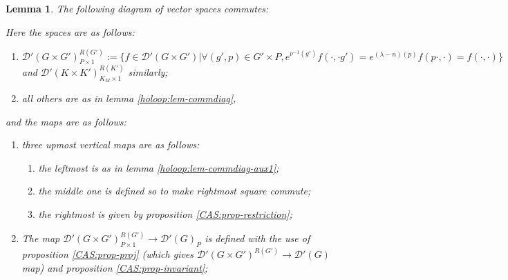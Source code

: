 \documentclass{article}
\newcommand{\assign}{:=}
\newcommand{\nobracket}{}
\newtheorem{lemma}{Lemma}
\begin{document}
\begin{lemma}
  \label{holoop:lem-main-commdiag}The following diagram of vector spaces
  commutes:
  
  \begin{center}
  \end{center}
  
  Here the spaces are as follows:
  \begin{enumerate}
    \item $\mathcal{D}' (G \times G')_{P \times 1}^{R (G')} \assign \{ f \in
    \mathcal{D}' (G \times G') | \forall (g', p) \in G' \times P, e^{\nu^{- 1}
    (g')} f (\cdot, \cdot g') = e^{(\lambda - n) (p)} f (p \cdot, \cdot) = f
    (\cdot, \cdot) \}$ and $\mathcal{D}' (K \times K')_{K_M \times 1}^{R
    (K')}$ similarly;
    
    \item all others are as in lemma \ref{holoop:lem-commdiag},
  \end{enumerate}
  and the maps are as follows:
  \begin{enumerate}
    \item three upmost vertical maps are as follows:
    \begin{enumerate}
      \item the leftmost is as in lemma \ref{holoop:lem-commdiag-aux1};
      
      \item the middle one is defined so to make rightmost square commute;
      
      \item the rightmost is given by proposition \ref{CAS:prop-restriction};
    \end{enumerate}
    \item The map $\mathcal{D}' (G \nobracket \times G' \nobracket)^{R
    (G')}_{P \times 1} \rightarrow \mathcal{D}' (G)_P$ is defined with the use
    of proposition \ref{CAS:prop-proj} (which gives $\mathcal{D}' (G \times
    G')^{R (G')} \rightarrow \mathcal{D}' (G)$ map) and proposition
    \ref{CAS:prop-invariant};
    

\end{enumerate}
\end{lemma}
\end{document}
